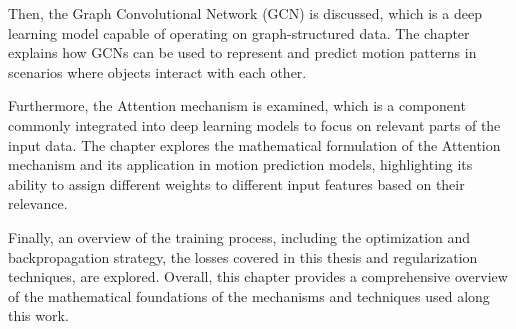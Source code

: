 Then, the Graph Convolutional Network (GCN) is discussed, which is a deep learning model capable of operating on graph-structured data. The chapter explains how GCNs can be used to represent and predict motion patterns in scenarios where objects interact with each other.

Furthermore, the Attention mechanism is examined, which is a component commonly integrated into deep learning models to focus on relevant parts of the input data. The chapter explores the mathematical formulation of the Attention mechanism and its application in motion prediction models, highlighting its ability to assign different weights to different input features based on their relevance.

Finally, an overview of the training process, including the optimization and backpropagation strategy, the losses covered in this thesis and regularization techniques, are explored. Overall, this chapter provides a comprehensive overview of the mathematical foundations of the mechanisms and techniques used along this work.